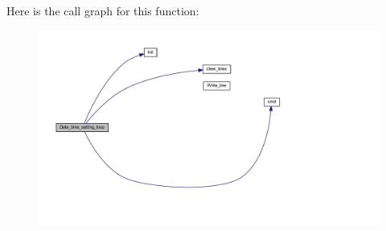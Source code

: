 Here is the call graph for this function\+:
\nopagebreak
\begin{figure}[H]
\begin{center}
\leavevmode
\includegraphics[width=350pt]{a00029_a9dc57df410d5474edcc75f449aa0b960_cgraph}
\end{center}
\end{figure}
